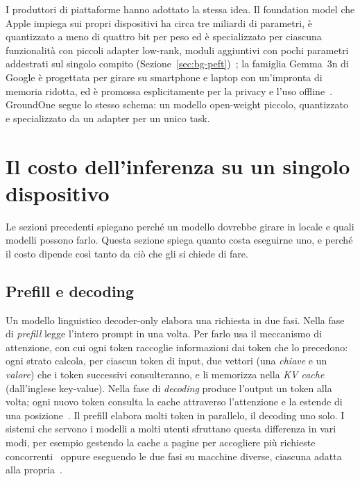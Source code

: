 I produttori di piattaforme hanno adottato la stessa idea. Il foundation model che Apple impiega sui propri dispositivi
ha circa tre miliardi di parametri, è quantizzato a meno di quattro bit per peso ed è specializzato per ciascuna
funzionalità con piccoli adapter low-rank, moduli aggiuntivi con pochi parametri addestrati sul singolo compito
(Sezione~\ref{sec:bg-peft})~\cite{gunter2024apple}; la famiglia Gemma~3n di Google è progettata per girare
su smartphone e laptop con un'impronta di memoria ridotta, ed è promossa esplicitamente per la privacy e l'uso
offline~\cite{google2025gemma3n}. GroundOne segue lo stesso schema: un modello open-weight piccolo, quantizzato e
specializzato da un adapter per un unico task.

\section{Il costo dell'inferenza su un singolo dispositivo}
\label{sec:bg-inference}

Le sezioni precedenti spiegano perché un modello dovrebbe girare in locale e quali modelli possono farlo. Questa sezione
spiega quanto costa eseguirne uno, e perché il costo dipende così tanto da ciò che gli si chiede di fare.

\subsection{Prefill e decoding}
\label{sec:local-phases}

Un modello linguistico decoder-only elabora una richiesta in due fasi. Nella fase di \emph{prefill} legge l'intero prompt
in una volta. Per farlo usa il meccanismo di attenzione, con cui ogni token raccoglie informazioni dai token che lo
precedono: ogni strato calcola, per ciascun token di input, due vettori (una \emph{chiave} e un \emph{valore}) che i
token successivi consulteranno, e li memorizza nella \emph{KV cache} (dall'inglese key-value). Nella fase di \emph{decoding} produce l'output un token alla
volta; ogni nuovo token consulta la cache attraverso l'attenzione e la estende di una posizione~\cite{pope2023scaling}. Il
prefill elabora molti token in parallelo, il decoding uno solo. I sistemi che servono i modelli a molti utenti sfruttano questa differenza in vari
modi, per esempio gestendo la cache a pagine per accogliere più richieste concorrenti~\cite{kwon2023pagedattention}
oppure eseguendo le due fasi su macchine diverse, ciascuna adatta alla propria~\cite{patel2024splitwise}.


